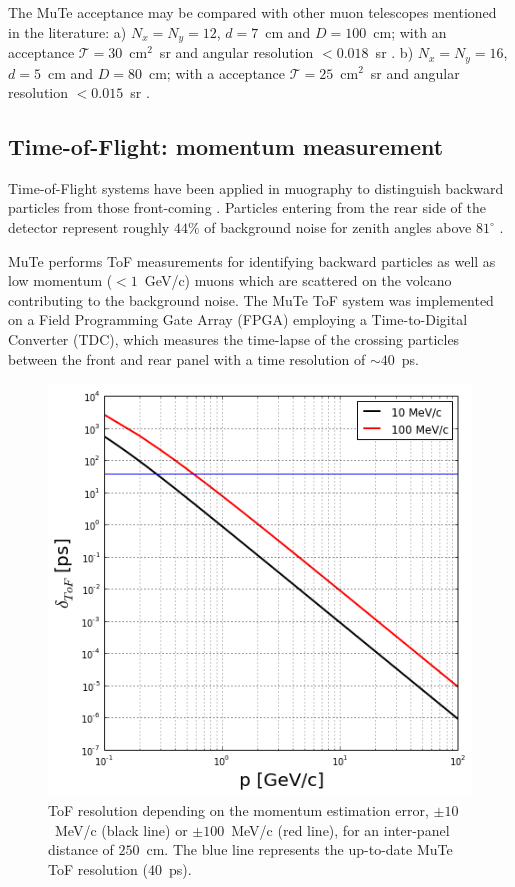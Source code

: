 \documentclass[letterpaper,11pt]{article}
\begin{document}
The MuTe acceptance may be compared with other muon telescopes mentioned in the literature: a) $N_x=N_y=12$, $d=7$~cm and $D=100$~cm; with an acceptance $\mathcal{T}=30$~cm$^{2}$~sr and angular resolution $< 0.018$~sr \cite{UchidaTanakaTanaka2009space}. b) $N_x=N_y=16$, $d=5$~cm and $D=80$~cm; with a acceptance $\mathcal{T}=25$~cm$^{2}$~sr and angular resolution $< 0.015$~sr \cite{LesparreEtal2010}.

\subsection{Time-of-Flight: momentum measurement}
Time-of-Flight systems have been applied in muography to distinguish backward particles from those front-coming \cite{jourde2013experimental}. Particles entering from the rear side of the detector represent roughly $44\%$ of background noise for zenith angles above $81^{\circ}$ \cite{nishiyama2016monte}.

MuTe performs ToF measurements for identifying backward particles as well as low momentum ($< 1$~GeV/c) muons which are scattered on the volcano contributing to the background noise. The MuTe ToF system was implemented on a Field Programming Gate Array (FPGA) employing a Time-to-Digital Converter (TDC), which measures the time-lapse of the crossing particles between the front and rear panel with a time resolution of $\sim 40$~ps.

\begin{figure}[htb]
\centering
\includegraphics[width=0.5\columnwidth]{Figures/ToF_Resolution_250cm.png}
\caption{ToF resolution depending on the momentum estimation error, $\pm 10$~MeV/c (black line) or $\pm 100$~MeV/c (red line), for an inter-panel distance of $250$~cm. The blue line represents the up-to-date MuTe ToF resolution ($40$~ps).}
\label{fig:ToF_Resolution}
\end{figure}
\end{document}
